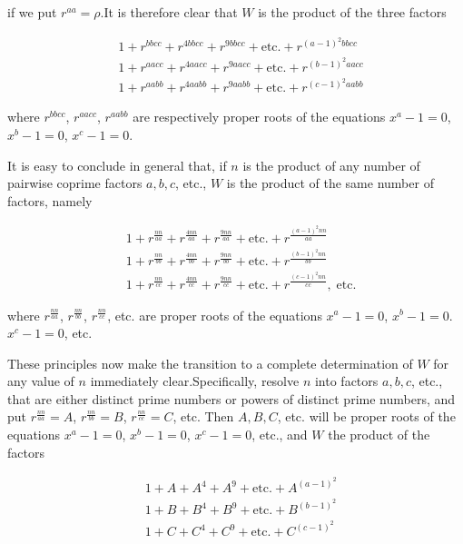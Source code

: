 if we put $r^{aa}=\rho$.\quad It is therefore clear that $W$ is the product of the three factors

\[
\begin{aligned}
&1+r^{bbcc}+r^{4bbcc}+r^{9bbcc}+\text{etc.}+r^{(a-1)^2bbcc}\\
&1+r^{aacc}+r^{4aacc}+r^{9aacc}+\text{etc.}+r^{(b-1)^2aacc}\\
&1+r^{aabb}+r^{4aabb}+r^{9aabb}+\text{etc.}+r^{(c-1)^2aabb}
\end{aligned}
\]

where $r^{bbcc}$, $r^{aacc}$, $r^{aabb}$ are respectively proper roots of the equations $x^a-1=0$, $x^b-1=0$, $x^c-1=0$.


It is easy to conclude in general that, if $n$ is the product of any number of pairwise coprime factors $a,b,c$, etc., $W$ is the product of the same number of factors, namely

\[
\begin{aligned}
&1+r^{\frac{nn}{aa}}+r^{\frac{4nn}{aa}}+r^{\frac{9nn}{aa}}+\text{etc.}+r^{\frac{(a-1)^2nn}{aa}}\\
&1+r^{\frac{nn}{bb}}+r^{\frac{4nn}{bb}}+r^{\frac{9nn}{bb}}+\text{etc.}+r^{\frac{(b-1)^2nn}{bb}}\\
&1+r^{\frac{nn}{cc}}+r^{\frac{4nn}{cc}}+r^{\frac{9nn}{cc}}+\text{etc.}+r^{\frac{(c-1)^2nn}{cc}},\;\text{etc.}
\end{aligned}
\]

where $r^{\frac{nn}{aa}}$, $r^{\frac{nn}{bb}}$, $r^{\frac{nn}{cc}}$, etc. are proper roots of the equations $x^a-1=0$, $x^b-1=0$. $x^c-1=0$, etc.


These principles now make the transition to a complete determination of $W$ for any value of $n$ immediately clear.\quad Specifically, resolve $n$ into factors
$a,b,c$, etc., that are either distinct prime numbers or powers of distinct prime numbers, and put $r^{\frac{nn}{aa}}=A$, $r^{\frac{nn}{bb}}=B$, $r^{\frac{nn}{cc}}=C$, etc. Then $A,B,C$, etc. will be proper roots of the equations $x^a-1=0$, $x^b-1=0$, $x^c-1=0$, etc., and $W$ the product of the factors

\[
\begin{aligned}
&1+A+A^4+A^9+\text{etc.}+A^{(a-1)^2}\\
&1+B+B^4+B^9+\text{etc.}+B^{(b-1)^2}\\
&1+C+C^4+C^9+\text{etc.}+C^{(c-1)^2}
\end{aligned}
\]

